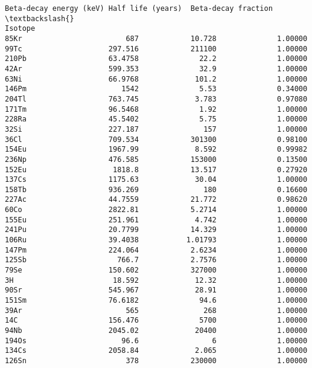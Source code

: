 \documentclass[11pt]{article}
\makeatletter
\newcommand{\boxspacing}{\kern\kvtcb@left@rule\kern\kvtcb@boxsep}
\newcommand{\prompt}[4]{
        \ttfamily\llap{{\color{#2}[#3]:\hspace{3pt}#4}}\vspace{-\baselineskip}
    }
\makeatother
\begin{document}
            \begin{tcolorbox}[breakable, size=fbox, boxrule=.5pt, pad at break*=1mm, opacityfill=0]
\prompt{Out}{outcolor}{155}{\boxspacing}
\begin{Verbatim}[commandchars=\\\{\}]
        Beta-decay energy (keV) Half life (years)  Beta-decay fraction  \textbackslash{}
Isotope
85Kr                        687            10.728              1.00000
99Tc                    297.516            211100              1.00000
210Pb                   63.4758              22.2              1.00000
42Ar                    599.353              32.9              1.00000
63Ni                    66.9768             101.2              1.00000
146Pm                      1542              5.53              0.34000
204Tl                   763.745             3.783              0.97080
171Tm                   96.5468              1.92              1.00000
228Ra                   45.5402              5.75              1.00000
32Si                    227.187               157              1.00000
36Cl                    709.534            301300              0.98100
154Eu                   1967.99             8.592              0.99982
236Np                   476.585            153000              0.13500
152Eu                    1818.8            13.517              0.27920
137Cs                   1175.63             30.04              1.00000
158Tb                   936.269               180              0.16600
227Ac                   44.7559            21.772              0.98620
60Co                    2822.81            5.2714              1.00000
155Eu                   251.961             4.742              1.00000
241Pu                   20.7799            14.329              1.00000
106Ru                   39.4038           1.01793              1.00000
147Pm                   224.064            2.6234              1.00000
125Sb                     766.7            2.7576              1.00000
79Se                    150.602            327000              1.00000
3H                       18.592             12.32              1.00000
90Sr                    545.967             28.91              1.00000
151Sm                   76.6182              94.6              1.00000
39Ar                        565               268              1.00000
14C                     156.476              5700              1.00000
94Nb                    2045.02             20400              1.00000
194Os                      96.6                 6              1.00000
134Cs                   2058.84             2.065              1.00000
126Sn                       378            230000              1.00000


\end{Verbatim}
\end{tcolorbox}
\end{document}
